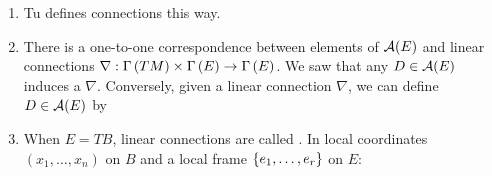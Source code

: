 \documentclass[main.tex]{subfiles}
\begin{document}
\begin{note}
    \begin{enumerate}
        \item Tu defines connections this way.
        \item There is a one-to-one correspondence between elements of $\mathcal{A}(E)$ and linear connections  $\nabla: \Gamma\left( TM \right) \times \Gamma\left( E \right) \to \Gamma\left( E \right)$. We saw that any $D \in \mathcal{A}(E)$ induces a $\nabla$. Conversely, given a linear connection $\nabla$, we can define $D \in \mathcal{A}(E)$ by
        \item When $E = TB$, linear connections
        are called . In local coordinates $(x_1, \dots, x_n)$ on $B$ and a local frame $\left\{e_1, \dots, e_r\right\}$ on $E$:
    \end{enumerate}
\end{note}
\end{document}
